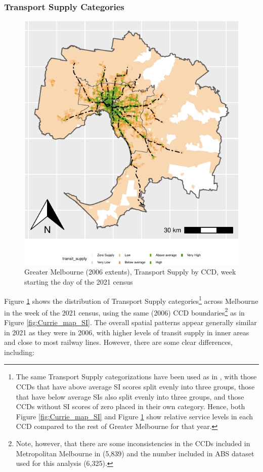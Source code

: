 \documentclass[preprint, 3p,
authoryear]{elsarticle} %
\begin{document}
\subsubsection{Transport Supply
Categories}\label{transport-supply-categories}

\begin{figure}
\includegraphics[width=1\linewidth]{Leveraging_GTFS_to_assess_transit_supply_Transport_Geography_files/figure-latex/Greater_Melbourne_CCD_2021-1} \caption{Greater Melbourne (2006 extents), Transport Supply by CCD, week starting the day of the 2021 census}\label{fig:Greater_Melbourne_CCD_2021}
\end{figure}

Figure \ref{fig:Greater_Melbourne_CCD_2021} shows the distribution of
Transport Supply categories\footnote{The same Transport Supply
  categorizations have been used as in \citet{currie2010identifying},
  with those CCDs that have above average SI scores split evenly into
  three groups, those that have below average SIs also split evenly into
  three groups, and those CCDs without SI scores of zero placed in their
  own category. Hence, both Figure \ref{fig:Currie_map_SI} and Figure
  \ref{fig:Greater_Melbourne_CCD_2021} show relative service levels in
  each CCD compared to the rest of Greater Melbourne for that year.}
across Melbourne in the week of the 2021 census, using the same (2006)
CCD boundaries\footnote{Note, however, that there are some
  inconsistencies in the CCDs included in Metropolitan Melbourne in
  \citet{currie2010identifying} (5,839) and the number included in ABS
  dataset used for this analysis (6,325).} as in Figure
\ref{fig:Currie_map_SI}. The overall spatial patterns appear generally
similar in 2021 as they were in 2006, with higher levels of transit
supply in inner areas and close to most railway lines. However, there
are some clear differences, including:
\end{document}
